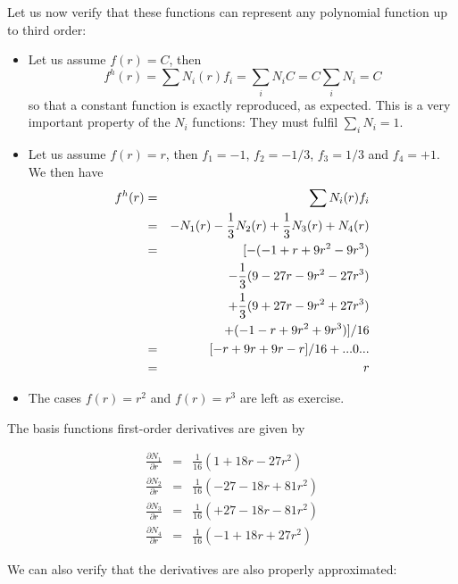 Let us now verify that these functions can represent any polynomial function up to third order:

\begin{itemize}
\item
Let us assume $f(r)=C$, then
\[
f^h(r) = \sum N_i(r) f_i = \sum_i N_i C = C \sum_i N_i  = C
\]
so that a constant function is exactly reproduced, as expected.
This is a very important property of the $N_i$ functions: They must fulfil $\sum\limits_i N_i =1$.

\item
Let us assume $f(r)= r$, then $f_1=-1$, $f_2=-1/3$, $f_3=1/3$ and $f_4=+1$. We then have
\begin{eqnarray}
f^h(r) 
&=& \sum N_i(r) f_i  \nonumber\\
&=& - N_1(r) -\frac{1}{3}N_2(r) + \frac{1}{3}N_3(r)  + N_4(r) \nonumber\\
&=& [-(-1+  r+9r^2- 9r^3 ) \nonumber\\
&&- \frac{1}{3} ( 9-27r-9r^2-27r^3 ) \nonumber\\
&&+ \frac{1}{3} ( 9+27r-9r^2+27r^3 ) \nonumber\\
&&+ (-1-  r+9r^2+ 9r^3 )]/16 \nonumber\\
&=& [-r +9r + 9r -r]/16  + ... 0 ... \nonumber\\
&=& r   
\end{eqnarray}

\item The cases $f(r)=r^2$ and $f(r)=r^3$ are left as exercise.

\end{itemize}

The basis functions first-order derivatives are given by
\begin{mdframed}[backgroundcolor=blue!5]
\begin{eqnarray}
\frac{\partial N_1}{\partial r}&=& \frac{1}{16}  (  1 +18r - 27r^2 ) \nonumber\\ 
\frac{\partial N_2}{\partial r}&=& \frac{1}{16}  (-27 -18r + 81r^2 ) \nonumber\\ 
\frac{\partial N_3}{\partial r}&=& \frac{1}{16}  (+27 -18r - 81r^2 ) \nonumber\\ 
\frac{\partial N_4}{\partial r}&=& \frac{1}{16}  ( -1 +18r + 27r^2 ) \nonumber
\end{eqnarray}
\end{mdframed}

We can also verify that the derivatives are also properly approximated:

